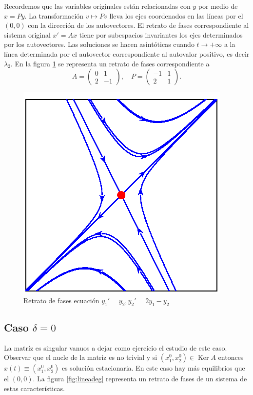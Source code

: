 Recordemos que las variables originales están relacionadas con $y$ por medio de $x=Py$. La transformación $v\mapsto Pv$ lleva los ejes coordenados en las líneas por el $(0,0)$ con la dirección de los autovectores. El retrato de fases correspondiente al sistema original $x'=Ax$ tiene por subespacios invariantes los ejes determinados por los autovectores. Las soluciones se hacen asintóticas cuando $t\to+\infty$ a la línea determinada por el autovector correspondiente al autovalor positivo, es decir $\lambda_2$.  En la figura \ref{fig:silla2} se representa un retrato de fases correspondiente a 
\[
 A=\begin{pmatrix}0 & 1\\2 & -1\end{pmatrix},\quad P=\begin{pmatrix}-1 & 1\\2 & 1\end{pmatrix}.
\]


\begin{figure}[h]
\begin{center}
\includegraphics[scale=.7]{imagenes/silla2.png}
\caption{Retrato de fases ecuación $y_1'=y_2, y_2'=2y_1-y_2$}\label{fig:silla2}
\end{center}
\end{figure}

\subsection{Caso $\delta=0$}  La matríz es singular vanuos a  dejar como  ejercicio el estudio de este caso. Observar que el nucle de la matriz es no trivial y si $(x_1^0,x_2^0)\in\operatorname{Ker}A$ entonces $x(t)\equiv(x_1^0,x_2^0)$ es solución estacionaria. En este caso hay más equilibrios que el $(0,0)$. La figura \ref{fig:lineadeg} representa un retrato de fases de un sistema de estas características.


